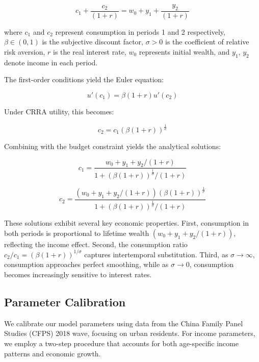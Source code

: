 \documentclass[12pt]{article}
\begin{document}
\begin{CJK*}{UTF8}{gbsn}
\begin{equation}
c_1 + \frac{c_2}{(1+r)} = w_0 + y_1 + \frac{y_2}{(1+r)}
\end{equation}

where $c_1$ and $c_2$ represent consumption in periods 1 and 2 respectively, $\beta \in (0,1)$ is the subjective discount factor, $\sigma > 0$ is the coefficient of relative risk aversion, $r$ is the real interest rate, $w_0$ represents initial wealth, and $y_1$, $y_2$ denote income in each period.

The first-order conditions yield the Euler equation:

\begin{equation}
u'(c_1) = \beta (1+r) u'(c_2)
\end{equation}

Under CRRA utility, this becomes:

\begin{equation}
c_2 = c_1(\beta (1+r))^{\frac{1}{\sigma}}
\end{equation}

Combining with the budget constraint yields the analytical solutions:

\begin{equation}
c_1 = \frac{w_0 + y_1 + y_2/(1+r)}{1 + (\beta (1+r))^{\frac{1}{\sigma}}/(1+r)}
\end{equation}

\begin{equation}
c_2 = \frac{(w_0 + y_1 + y_2/(1+r))(\beta (1+r))^{\frac{1}{\sigma}}}{1 + (\beta (1+r))^{\frac{1}{\sigma}}/(1+r)}
\end{equation}

These solutions exhibit several key economic properties. First, consumption in both periods is proportional to lifetime wealth $(w_0 + y_1 + y_2/(1+r))$, reflecting the income effect. Second, the consumption ratio $c_2/c_1 = (\beta (1+r))^{1/\sigma}$ captures intertemporal substitution. Third, as $\sigma \to \infty$, consumption approaches perfect smoothing, while as $\sigma \to 0$, consumption becomes increasingly sensitive to interest rates.

\subsection{Parameter Calibration}

We calibrate our model parameters using data from the China Family Panel Studies (CFPS) 2018 wave, focusing on urban residents. For income parameters, we employ a two-step procedure that accounts for both age-specific income patterns and economic growth.


\end{CJK*}
\end{document}
